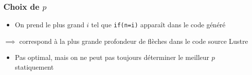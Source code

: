 \documentclass[18pt]{beamer}
\begin{document}
\begin{frame}
	\frametitle{Choix de $p$}
	\begin{itemize}
	\item On prend le plus grand $i$ tel que \texttt{if(n=i)} apparaît dans le code généré
	\end{itemize}
	$\implies$ correspond à la plus grande profondeur de flèches dans le code source Lustre
	
	\begin{itemize}
		\item Pas optimal, mais on ne peut pas toujours déterminer le meilleur $p$ statiquement
	\end{itemize}
\end{frame}
\end{document}
